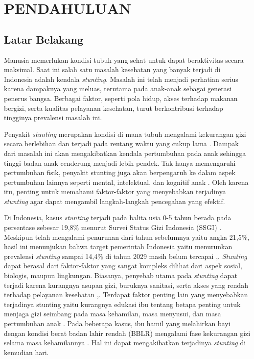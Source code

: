 \newpage
\pagestyle{fancy}
\fancyhf{}
\fancyhead[R]{\thepage}
\chapter{PENDAHULUAN} \label{Bab I}

\section{Latar Belakang} \label{I.Latar Belakang}
Manusia memerlukan kondisi tubuh yang sehat untuk dapat beraktivitas secara maksimal. Saat ini salah satu masalah kesehatan yang banyak terjadi di Indonesia adalah kendala \textit{stunting}. Masalah ini telah menjadi perhatian serius karena dampaknya yang meluas, terutama pada anak-anak sebagai generasi penerus bangsa. Berbagai faktor, seperti pola hidup, akses terhadap makanan bergizi, serta kualitas pelayanan kesehatan, turut berkontribusi terhadap tingginya prevalensi masalah ini.

Penyakit \textit{stunting} merupakan kondisi di mana tubuh mengalami kekurangan gizi secara berlebihan dan terjadi pada rentang waktu yang cukup lama \cite{said2024pencegahan}. Dampak dari masalah ini akan mengakibatkan kendala pertumbuhan pada anak sehingga tinggi badan anak cenderung menjadi lebih pendek. Tak hanya memengaruhi pertumbuhan fisik, penyakit stunting juga akan berpengaruh ke dalam aspek pertumbuhan lainnya seperti mental, intelektual, dan kognitif anak \cite{rahagia2023upaya}. Oleh karena itu, penting untuk memahami faktor-faktor yang menyebabkan terjadinya \textit{stunting} agar dapat mengambil langkah-langkah pencegahan yang efektif.

Di Indonesia, kasus \textit{stunting} terjadi pada balita usia 0-5 tahun berada pada persentase sebesar 19,8\% menurut Survei Status Gizi Indonesia (SSGI) \cite{kemenkes2025ssgi}. Meskipun telah mengalami penurunan dari tahun sebelumnya yaitu angka 21,5\%, hasil ini menunjukan bahwa target pemerintah Indonesia yaitu menurunkan prevalensi \textit{stunting} sampai 14,4\% di tahun 2029 masih belum tercapai \cite{bkpk2023ski},\cite{setneg2024strategi}. \textit{Stunting} dapat berasal dari faktor-faktor yang sangat kompleks dilihat dari aspek sosial, biologis, maupun lingkungan. Biasanya, penyebab utama pada \textit{stunting} dapat terjadi karena kurangnya asupan gizi, buruknya sanitasi, serta akses yang rendah terhadap pelayanan kesehatan \cite{supriyanto2023implementasi},\cite{saleh2023edukasi}. Terdapat faktor penting lain yang menyebabkan terjadinya stunting yaitu kurangnya edukasi ibu tentang betapa penting untuk menjaga gizi seimbang pada masa kehamilan, masa menyusui, dan masa pertumbuhan anak \cite{saleh2023edukasi}. Pada beberapa kasus, ibu hamil yang melahirkan bayi dengan kondisi berat badan lahir rendah (BBLR) mengalami fase kekurangan gizi selama masa kehamilannya \cite{saleh2023edukasi}. Hal ini dapat mengakibatkan terjadinya \textit{stunting} di kemudian hari. 

